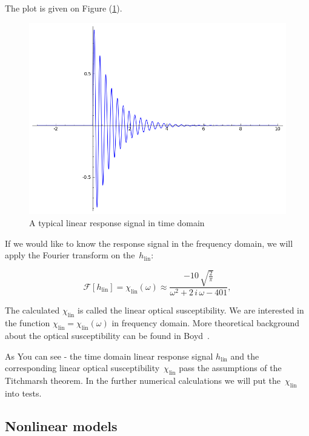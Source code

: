 \documentclass[12pt,twoside,a4paper]{article}
\numberwithin{equation}{subsection}
\numberwithin{figure}{subsection}
\begin{document}
The plot is given on Figure (\ref{fig:physical_linplot}).

\begin{figure}[H]
  \includegraphics[width=150mm]{img/lin_plot1.png}
  \caption{A typical linear response signal in time domain \label{fig:physical_linplot}}
\end{figure}

If we would like to know the response signal in the frequency domain, we will apply the Fourier transform on the~$ h_{\text{lin}} $:

\begin{equation} \label{eq:physical_frequency_linear}
  \mathcal{F}[h_{\text{lin}}] = \chi_{\text{lin}}(\omega) \approx \frac{ -10 \, \sqrt{\frac{2}{\pi}}}{\omega^2 + 2 \,i \,\omega - 401},
\end{equation}

The calculated $ \chi_{\text{lin}} $ is called the linear optical susceptibility. We are interested in the function $ \chi_{\text{lin}} = \chi_{\text{lin}}(\omega)$ in frequency domain. More theoretical background about the optical susceptibility can be found in Boyd~\cite{boyd_nlo}. 

As You can see - the time domain linear response signal $ h_{\text{lin}} $ and the corresponding linear optical susceptibility~$ \chi_{\text{lin}} $ pass the assumptions of the Titchmarsh theorem. In the further numerical calculations we will put the~$ \chi_{\text{lin}} $ into tests. 

\subsection{Nonlinear models} \label{chap:physical_simnlo}
\end{document}
